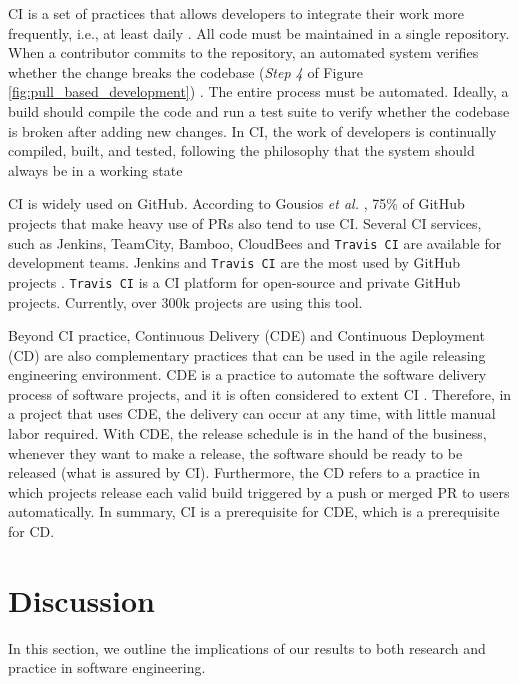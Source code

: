 CI is a set of practices that allows developers to integrate their work more frequently, i.e., at least daily \citep{Fowler2006-zc,Meyer2014-px}. All code must be maintained in a single repository. When a contributor commits to the repository, an automated system verifies whether the change breaks the codebase (\textit{Step 4} of Figure \ref{fig:pull_based_development}) \citep{Meyer2014-px}. The entire process must be automated. Ideally, a build should compile the code and run a test suite to verify whether the codebase is broken after adding new changes. In CI, the work of developers is continually
compiled, built, and tested, following the philosophy that the system should always be in a working state~\citep{Yu2016-cy,Duvall2007-tb}

CI is widely used on GitHub. According to Gousios \textit{et al.} \citep{Gousios2015-ui}, 75\% of GitHub projects that make heavy use of PRs also tend to use CI. Several CI services, such as Jenkins, TeamCity, Bamboo, CloudBees and \texttt{Travis CI} \citep{Meyer2014-px} are available for development teams.  Jenkins and \texttt{Travis CI} are the most used by GitHub projects \citep{Vasilescu2015-tn}. \texttt{Travis CI} is a CI platform for open-source and private GitHub projects. Currently, over 300k projects are using this tool.

Beyond CI practice, Continuous Delivery (CDE) and Continuous Deployment (CD) are also complementary practices that can be used in the agile releasing engineering environment. CDE is a practice to automate the software delivery process of software projects, and it is often considered to extent CI \citep{Karvonen201787}. Therefore, in a project that uses CDE, the delivery can occur at any time, with little manual labor required. With CDE, the release schedule is in the hand of the business, whenever they want to make a release, the software should be ready to be released (what is assured by CI). Furthermore, the CD refers to a practice in which projects release each valid build triggered by a push or merged PR to users automatically. In summary, CI is a prerequisite for CDE, which is a prerequisite for CD.
\section{Discussion}\label{sec_discussion}

In this section, we outline the implications of our results
to both research and practice in software engineering. 

